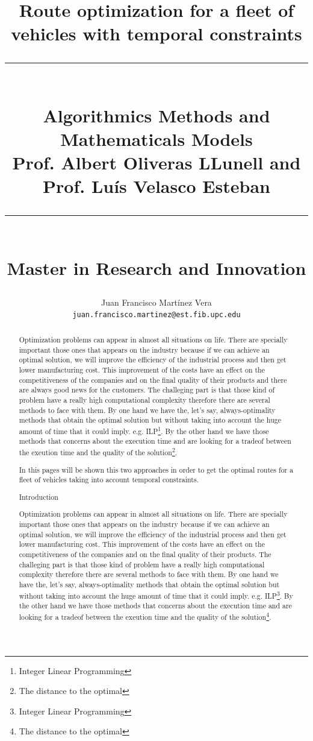 \documentclass[]{report}
\title{{\Huge Route optimization for a fleet of vehicles with temporal constraints} \\
\noindent\rule{4cm}{0.4pt}\\
Algorithmics Methods and Mathematicals Models \\
Prof. Albert Oliveras LLunell and Prof. Lu\'is Velasco Esteban\\
\noindent\rule{4cm}{0.4pt}\\
Master in Research and Innovation}
\author{Juan Francisco Mart\'inez Vera \\
{\tt juan.francisco.martinez@est.fib.upc.edu}}
\begin{document}
\maketitle

\newcommand{\localtextbulletone}{\textcolor{gray}{\raisebox{.50ex}{\rule{.6ex}{.6ex}}}}
\renewcommand{\labelitemi}{\localtextbulletone}

\begin{abstract}
	Optimization problems can appear in almost all situations on life. There are specially important those ones that appears on the industry because if we can achieve an optimal solution, we will improve the efficiency of the industrial process and then get lower manufacturing cost. This improvement of the costs have an effect on the competitiveness of the companies and on the final quality of their products and there are always good news for the customers. The challeging part is that those kind of problem have a really high computational complexity therefore there are several methods to face with them. By one hand we have the, let's say, always-optimality methods that obtain the optimal solution but without taking into account the huge amount of time that it could imply. e.g. ILP\footnote{Integer Linear Programming}. By the other hand we have those methods that concerns about the execution time and are looking for a tradeof between the exeution time and the quality of the solution\footnote{The distance to the optimal}.
	
	In this pages will be shown this two approaches in order to get the optimal routes for a fleet of vehicles taking into account temporal constraints.
	
\tableofcontents
	
\chapter{Introduction}
	Optimization problems can appear in almost all situations on life. There are specially important those ones that appears on the industry because if we can achieve an optimal solution, we will improve the efficiency of the industrial process and then get lower manufacturing cost. This improvement of the costs have an effect on the competitiveness of the companies and on the final quality of their products. The challeging part is that those kind of problem have a really high computational complexity therefore there are several methods to face with them. By one hand we have the, let's say, always-optimality methods that obtain the optimal solution but without taking into account the huge amount of time that it could imply. e.g. ILP\footnote{Integer Linear Programming}. By the other hand we have those methods that concerns about the execution time and are looking for a tradeof between the exeution time and the quality of the solution\footnote{The distance to the optimal}.
	

\end{abstract}
\end{document}
